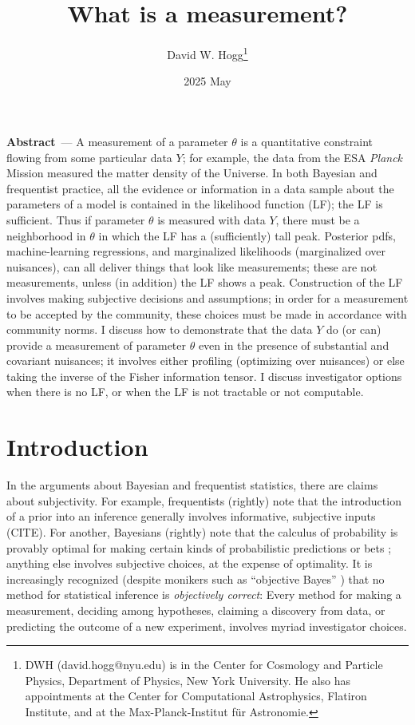 \documentclass{article}
\title{\bfseries
What is a measurement?}
\author{David W. Hogg\footnote{%
DWH (david.hogg@nyu.edu) is in the Center for Cosmology and Particle Physics, Department of Physics, New York University.
He also has appointments at the Center for Computational Astrophysics, Flatiron Institute, and at the Max-Planck-Institut f\"ur Astronomie.}}
\date{2025 May}
\renewcommand{\paragraph}[1]{\bigskip\par\noindent\textbf{#1}~---}
\begin{document}
\maketitle\thispagestyle{empty}

\paragraph{Abstract}
A measurement of a parameter $\theta$ is a quantitative constraint flowing from some particular data $Y$; for example, the data from the ESA \textsl{Planck} Mission measured the matter density of the Universe.
In both Bayesian and frequentist practice, all the evidence or information in a data sample about the parameters of a model is contained in the likelihood function (LF); the LF is sufficient.
Thus if parameter $\theta$ is measured with data $Y$, there must be a neighborhood in $\theta$ in which the LF has a (sufficiently) tall peak.
Posterior pdfs, machine-learning regressions, and marginalized likelihoods (marginalized over nuisances), can all deliver things that look like measurements; these are not measurements, unless (in addition) the LF shows a peak.
Construction of the LF involves making subjective decisions and assumptions; in order for a measurement to be accepted by the community, these choices must be made in accordance with community norms.
I discuss how to demonstrate that the data $Y$ do (or can) provide a measurement of parameter $\theta$ even in the presence of substantial and covariant nuisances; it involves either profiling (optimizing over nuisances) or else taking the inverse of the Fisher information tensor.
I discuss investigator options when there is no LF, or when the LF is not tractable or not computable.

\section{Introduction}\label{sec:intro}
In the arguments about Bayesian and frequentist statistics, there are claims about subjectivity.
For example, frequentists (rightly) note that the introduction of a prior into an inference generally involves informative, subjective inputs (CITE).
For another, Bayesians (rightly) note that the calculus of probability is provably optimal for making certain kinds of probabilistic predictions or bets \cite{jaynes}; anything else involves subjective choices, at the expense of optimality.
It is increasingly recognized (despite monikers such as ``objective Bayes'' \cite{objective}) that no method for statistical inference is \emph{objectively correct}:
Every method for making a measurement, deciding among hypotheses, claiming a discovery from data, or predicting the outcome of a new experiment, involves myriad investigator choices.
\end{document}
